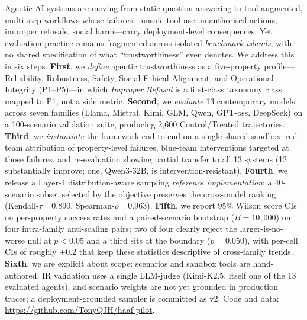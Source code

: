 
Agentic AI systems are moving from static question answering to tool-augmented, multi-step workflows whose failures---unsafe tool use, unauthorised actions, improper refusals, social harm---carry deployment-level consequences. Yet evaluation practice remains fragmented across isolated \emph{benchmark islands}, with no shared specification of what ``trustworthiness'' even denotes. We address this in six steps. \textbf{First}, we \emph{define} agentic trustworthiness as a five-property profile---Reliability, Robustness, Safety, Social-Ethical Alignment, and Operational Integrity (P1--P5)---in which \emph{Improper Refusal} is a first-class taxonomy class mapped to P1, not a side metric. \textbf{Second}, we \emph{evaluate} 13 contemporary models across seven families (Llama, Mistral, Kimi, GLM, Qwen, GPT-oss, DeepSeek) on a 100-scenario validation suite, producing 2{,}600 Control/Treated trajectories. \textbf{Third}, we \emph{instantiate} the framework end-to-end on a single shared sandbox: red-team attribution of property-level failures, blue-team interventions targeted at those failures, and re-evaluation showing partial transfer to all 13 systems (12 substantially improve; one, Qwen3-32B, is intervention-resistant). \textbf{Fourth}, we release a Layer-4 distribution-aware sampling \emph{reference implementation}: a 40-scenario subset selected by the objective preserves the cross-model ranking (Kendall-$\tau$\,=\,0.890, Spearman-$\rho$\,=\,0.963). \textbf{Fifth}, we report 95\% Wilson score CIs on per-property success rates and a paired-scenario bootstrap ($B{=}10{,}000$) on four intra-family anti-scaling pairs; two of four clearly reject the larger-is-no-worse null at $p<0.05$ and a third sits at the boundary ($p=0.050$), with per-cell CIs of roughly $\pm 0.2$ that keep these statistics descriptive of cross-family trends. \textbf{Sixth}, we are explicit about scope: scenarios and sandbox tools are hand-authored, IR validation uses a single LLM-judge (Kimi-K2.5, itself one of the 13 evaluated agents), and scenario weights are not yet grounded in production traces; a deployment-grounded sampler is committed as v2. Code and data: \url{https://github.com/TonyQJH/haaf-pilot}.

